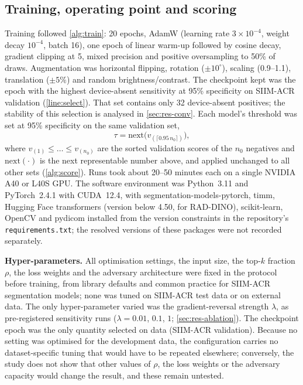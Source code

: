 \documentclass{ieeeaccess}
\begin{document}
\subsection{Training, operating point and scoring}
\label{sec:training}
Training followed \cref{alg:train}: 20 epochs, AdamW (learning rate $3\times10^{-4}$, weight decay $10^{-4}$, batch 16), one epoch of linear warm-up followed by cosine decay, gradient clipping at 5, mixed precision and positive oversampling to 50\% of draws. Augmentation was horizontal flipping, rotation ($\pm10^\circ$), scaling (0.9--1.1), translation ($\pm5\%$) and random brightness/contrast. The checkpoint kept was the epoch with the highest device-absent sensitivity at 95\% specificity on SIIM-ACR validation (\cref{line:select}). That set contains only 32 device-absent positives; the stability of this selection is analysed in \cref{sec:res-conv}. Each model's threshold was set at 95\% specificity on the same validation set,
\begin{equation}
\tau = \mathrm{next}\big(v_{(\lceil 0.95\,n_0\rceil)}\big),
\label{eq:tau}
\end{equation}
where $v_{(1)}\le\dots\le v_{(n_0)}$ are the sorted validation scores of the $n_0$ negatives and $\mathrm{next}(\cdot)$ is the next representable number above, and applied unchanged to all other sets (\cref{alg:score}). Runs took about 20--50 minutes each on a single NVIDIA A40 or L40S GPU. The software environment was Python~3.11 and PyTorch~2.4.1 with CUDA~12.4, with segmentation-models-pytorch, timm, Hugging Face transformers (version below 4.50, for RAD-DINO), scikit-learn, OpenCV and pydicom installed from the version constraints in the repository's \texttt{requirements.txt}; the resolved versions of these packages were not recorded separately.

\textbf{Hyper-parameters.} All optimisation settings, the input size, the top-$k$ fraction $\rho$, the loss weights and the adversary architecture were fixed in the protocol before training, from library defaults and common practice for SIIM-ACR segmentation models; none was tuned on SIIM-ACR test data or on external data. The only hyper-parameter varied was the gradient-reversal strength $\lambda$, as pre-registered sensitivity runs ($\lambda=0.01$, $0.1$, $1$; \cref{sec:res-ablation}). The checkpoint epoch was the only quantity selected on data (SIIM-ACR validation). Because no setting was optimised for the development data, the configuration carries no dataset-specific tuning that would have to be repeated elsewhere; conversely, the study does not show that other values of $\rho$, the loss weights or the adversary capacity would change the result, and these remain untested.
\end{document}
